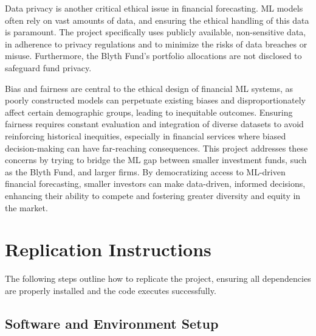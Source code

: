 \documentclass[10pt,twocolumn]{article}
\begin{document}
Data privacy is another critical ethical issue in financial forecasting. ML models often rely on vast amounts of data, and ensuring the ethical handling of this data is paramount. The project specifically uses publicly available, non-sensitive data, in adherence to privacy regulations and to minimize the risks of data breaches or misuse. Furthermore, the Blyth Fund's portfolio allocations are not disclosed to safeguard fund privacy.

Bias and fairness are central to the ethical design of financial ML systems, as poorly constructed models can perpetuate existing biases and disproportionately affect certain demographic groups, leading to inequitable outcomes. Ensuring fairness requires constant evaluation and integration of diverse datasets to avoid reinforcing historical inequities, especially in financial services where biased decision-making can have far-reaching consequences. This project addresses these concerns by trying to bridge the ML gap between smaller investment funds, such as the Blyth Fund, and larger firms. By democratizing access to ML-driven financial forecasting, smaller investors can make data-driven, informed decisions, enhancing their ability to compete and fostering greater diversity and equity in the market.

\section{Replication Instructions}

The following steps outline how to replicate the project, ensuring all dependencies are properly installed and the code executes successfully.

\subsection{Software and Environment Setup}
\end{document}
